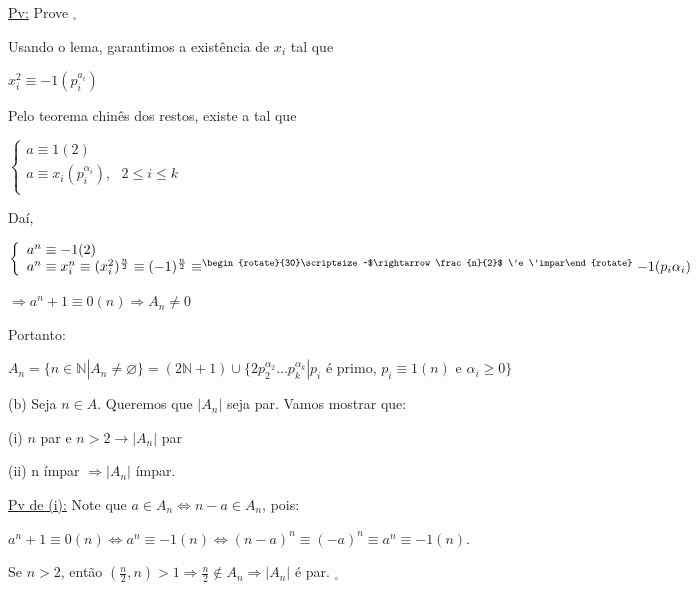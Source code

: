 \documentclass[a4paper,12pt]{article}
\renewcommand{\leq}{\ensuremath{\leqslant}}
\renewcommand{\geq}{\ensuremath{\geqslant}}
\theoremstyle{plain} %
\theoremstyle{definition} %
\theoremstyle{remark} %
\newcommand{\rotsupup}[1]{\begin{rotate}{30}\scriptsize ~#1\end{rotate}} %
\begin{document}
	\begin{framed}
		\underline{Pv:} Prove $_\square$
		
		Usando o lema, garantimos a exist\^encia de $x_i$ tal que
		
		\begin{center}
			$x_i^2\equiv -1(p_i^{a_i})$
		\end{center}
		
		Pelo teorema chin\^es dos restos, existe a tal que
		
		\begin{center}
			$\left\{
			\begin{array}{lcl}
				a\equiv 1(2)\\
				a\equiv x_i(p_i^{\alpha_i}), \text{ } 2\leq i\leq k\\
			\end{array}
			\right.$ 
		\end{center}
		
		Da\'i,
		
		\vspace{1em}
		$\left\{
		\begin{array}{lcl}
			a^n\equiv -1(2)\\
			a^n\equiv x_i^n \equiv (x_i^2)^{\frac{n}{2}}\equiv (-1)^{\frac{n}{2}}\equiv^{\rotsupup{$\rightarrow \frac{n}{2}$ \'e \'impar}}-1(p_i\alpha_i)\\
		\end{array}
		\right.$ 
		
		\vspace{1em}
		$\Rightarrow a^n+1\equiv 0(n)\Rightarrow A_n\neq0$
		
		Portanto:
		
		$A_n=\{n\in\mathds{N}|A_n\neq\varnothing\}=(2\mathds{N}+1)\cup\{2p_2^{\alpha_2} \dotso p_k^{\alpha_k} | p_i$ \'e primo, $p_i\equiv 1(n)$ e $\alpha_i\geq0\}$
		
		(b) Seja $n\in A$. Queremos que $|A_n|$ seja par. Vamos mostrar que:
		
		(i) $n$ par e $n>2\rightarrow |A_n|$ par
		
		(ii) n \'impar $\Rightarrow |A_n|$ \'impar. 
		
		\underline{Pv de (i):} Note que $a\in A_n \Leftrightarrow n-a\in A_n$, pois:
		
		$a^n+1\equiv 0(n) \Leftrightarrow a^n\equiv -1(n)\Leftrightarrow (n-a)^n\equiv (-a)^n\equiv a^n\equiv -1(n)$.
		
		Se $n>2$, ent\~ao $\left(\frac{n}{2}, n\right)>1\Rightarrow \frac{n}{2}\not\in A_n\Rightarrow |A_n|$ \'e par. $_\square$
		

\end{framed}
\end{document}
